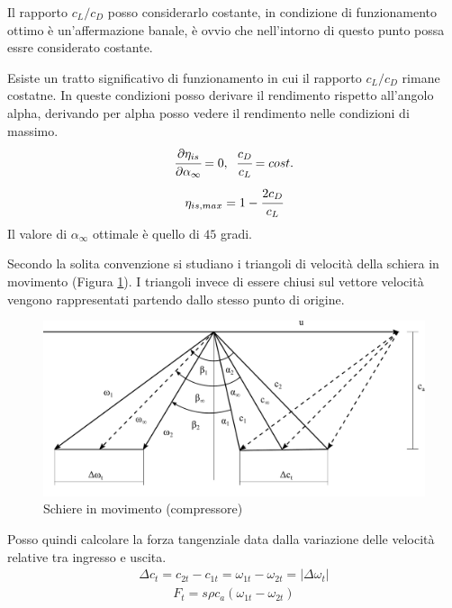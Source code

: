 Il rapporto $c_L/c_D$ posso considerarlo costante, in condizione di funzionamento ottimo è un'affermazione banale, è ovvio che nell'intorno di questo punto possa essre considerato costante. 

Esiste un tratto significativo di funzionamento in cui il rapporto $c_L/c_D$ rimane costatne. In queste condizioni posso derivare il rendimento rispetto all'angolo alpha, derivando per alpha posso vedere il rendimento nelle condizioni di massimo.
\begin{align*}
\cfrac{\partial \eta_{is}}{\partial \alpha_{\infty}} = 0, \;\; \cfrac{c_D}{c_L} = cost.
\end{align*}
\begin{align*}
\eta_{is,max} = 1- \cfrac{2 c_D}{c_L}
\end{align*}
Il valore di $\alpha_{\infty}$ ottimale è quello di $45$ gradi.

Secondo la solita convenzione si studiano i triangoli di velocità della schiera in movimento (Figura \ref{fig:SchiereCompr}). I triangoli invece di essere chiusi sul vettore velocità vengono rappresentati partendo dallo stesso punto di origine. 
\begin{figure}
\centering
  \includegraphics[width=\textwidth]{fig/SchiereCompr.pdf}
\caption{Schiere in movimento (compressore)}
\label{fig:SchiereCompr}
\end{figure}
Posso quindi calcolare la forza tangenziale data dalla variazione delle velocità relative tra ingresso e uscita.
\begin{align*}
\Delta c_t = c_{2t} - c_{1t} = \omega_{1t} - \omega_{2t} = |\Delta \omega_t |
\end{align*}
\begin{align*}
F_t = s \rho c_a (\omega_{1t} - \omega_{2t})
\end{align*}

